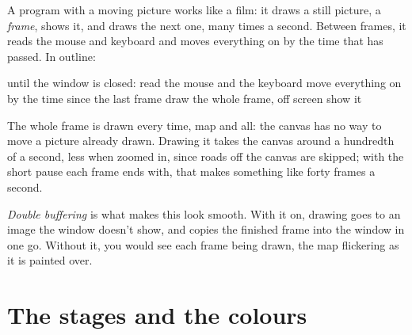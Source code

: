 A program with a moving picture works like a film: it draws a still
picture, a \emph{frame}, shows it, and draws the next one, many times a
second. Between frames, it reads the mouse and keyboard and moves
everything on by the time that has passed. In outline:

\begin{shell}
until the window is closed:
    read the mouse and the keyboard
    move everything on by the time since the last frame
    draw the whole frame, off screen
    show it
\end{shell}

The whole frame is drawn every time, map and all: the canvas has no way to
move a picture already drawn. Drawing it takes the canvas around a
hundredth of a second, less when zoomed in, since roads off the canvas are
skipped; with the short pause each frame ends with, that makes something
like forty frames a second.

\emph{Double buffering} is what makes this look smooth. With it on,
drawing goes to an image the window doesn't show, and  copies
the finished frame into the window in one go. Without it, you would see
each frame being drawn, the map flickering as it is painted over.

\section{The stages and the colours}

